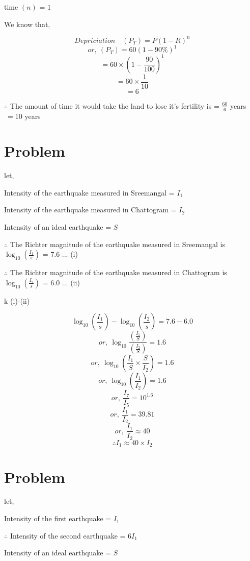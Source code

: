 \documentclass{report}
\begin{document}
time $(n)$ = $1$

We know that,

$$Depriciation\quad (P_T)= P(1-R)^{n} $$
$$or,\: (P_T) = 60(1-90\%)^{1}$$
$$ = 60\times(1-\frac{90}{100})^{1}$$
$$ = 60\times \frac{1}{10}$$
$$= 6$$

$\therefore$ The amount of time it would take the land to lose it's fertility is = $\frac{60}{6}$ years
$\ = 10  $ years

\section{Problem}

let,

Intensity of the earthquake measured in Sreemangal = $I_1$

Intensity of the earthquake measured in Chattogram = $I_2$ 

Intensity of an ideal earthquake = $S$

\hspace{30cm}

$\therefore$ The Richter magnitude of the earthquake measured in Sreemangal is $\log_{10}\left(\frac{I_1}{s}\right)$ = 7.6 ... (i)

$\therefore$ The Richter magnitude of the earthquake measured in Chattogram is $\log_{10}\left(\frac{I_2}{s}\right)$ = 6.0 ... (ii)

\hspace{30cm}
k (i)-(ii)

$$\log_{10}\left(\frac{I_1}{s}\right) - \log_{10}\left(\frac{I_2}{s}\right) = 7.6-6.0$$
$$or,\: \log_{10} \frac{\left(\frac{I_1}{S}\right)}{\left(\frac{I_2}{S}\right)} = 1.6$$
$$or,\: \log_{10}\left(\frac{I_1}{S}\times\frac{S}{I_2}\right) = 1.6 $$
$$or,\: \log_{10}\left(\frac{I_1}{I_2}\right) = 1.6$$
$$or,\: \frac{I_7}{I_5} = 10^{1.6}$$
$$or,\: \frac{I_1}{I_2} = 39.81$$
$$or,\: \frac{I_1}{I_2} \approx 40$$
$$\therefore I_1 \approx 40 \times I_2$$

\section{Problem}

let,

Intensity of the first earthquake = $I_1$

$\therefore$ Intensity of the second earthquake  = $6I_1$ 

Intensity of an ideal earthquake = $S$

\hspace{30cm}
\end{document}
